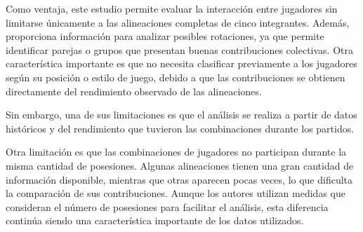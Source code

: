 Como ventaja, este estudio permite evaluar la interacción entre jugadores sin limitarse únicamente a las alineaciones completas de cinco integrantes. Además, proporciona información para analizar posibles rotaciones, ya que permite identificar parejas o grupos que presentan buenas contribuciones colectivas. Otra característica importante es que no necesita clasificar previamente a los jugadores según su posición o estilo de juego, debido a que las contribuciones se obtienen directamente del rendimiento observado de las alineaciones.

Sin embargo, una de sus limitaciones es que el análisis se realiza a partir de datos históricos y del rendimiento que tuvieron las combinaciones durante los partidos. 

Otra limitación es que las combinaciones de jugadores no participan durante la misma cantidad de posesiones. Algunas alineaciones tienen una gran cantidad de información disponible, mientras que otras aparecen pocas veces, lo que dificulta la comparación de sus contribuciones. Aunque los autores utilizan medidas que consideran el número de posesiones para facilitar el análisis, esta diferencia continúa siendo una característica importante de los datos utilizados.

\cite{devlin2020identifyinggroupcontributionsnba}